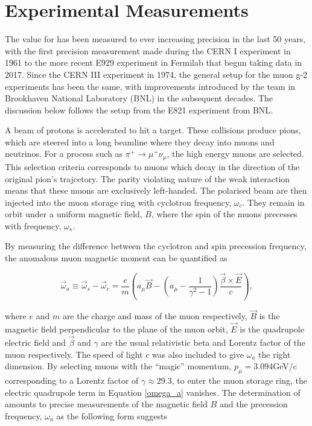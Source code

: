 \documentclass{article}
\numberwithin{equation}{section} %
\begin{document}
\section{Experimental Measurements}\label{exp}
The value for \amu has been measured to ever increasing precision in the last 50 years, with the first precision measurement made during the CERN I experiment in 1961\cite{fermilab} to the more recent E929 experiment in Fermilab that begun taking data in 2017. Since the CERN III experiment in 1974, the general setup for the muon g-2 experiments has been the same, with improvements introduced by the team in Brookhaven National Laboratory (BNL) in the subsequent decades. The discussion below follows the setup from the E821 experiment from BNL\cite{bnl}.

A beam of protons is accelerated to hit a target. These collisions produce pions, which are steered into a long beamline where they decay into muons and neutrinos. For a process such as $\pi^+ \rightarrow \mu^+\nu_\mu$, the high energy muons are selected. This selection criteria corresponds to muons which decay in the direction of the original pion's trajcetory. The parity violating nature of the weak interaction means that these muons are exclusively left-handed\cite{sm}. The polarised beam are then injected into the muon storage ring with cyclotron frequency, $\omega_c$. They remain in orbit under a uniform magnetic field, $B$, where the spin of the muons precesses with frequency, $\omega_s$.

By measuring the difference between the cyclotron and spin precession frequency, the anomalous muon magnetic moment can be quantified as

\begin{equation}
\vec{\omega}_a \equiv \vec{\omega}_s-\vec{\omega}_c = \frac{e}{m}\left( a_\mu \vec{B}-(a_\mu-\frac{1}{\gamma^2-1})\frac{\vec{\beta}\times\vec{E}}{c}\right),
\label{omega_a}
\end{equation} 

\noindent where $e$ and $m$ are the charge and mass of the muon respectively, $\vec{B}$ is the magnetic field perpendicular to the plane of the muon orbit, $\vec{E}$ is the quadrupole electric field and $\vec{\beta}$ and $\gamma$ are the usual relativistic beta and Lorentz factor of the muon respectively. The speed of light $c$ was also included to give $\omega_a$ the right dimension. By selecting muons with the ``magic'' momentum, $p_\mu=3.094$GeV/c corresponding to a Lorentz factor of $\gamma\approx 29.3$, to enter the muon storage ring, the electric quadrupole term in Equation \ref{omega_a} vanishes. The determination of \amu amounts to precise measurements of the magnetic field $B$ and the precession frequency, $\omega_a$ as the following form suggests
\end{document}
